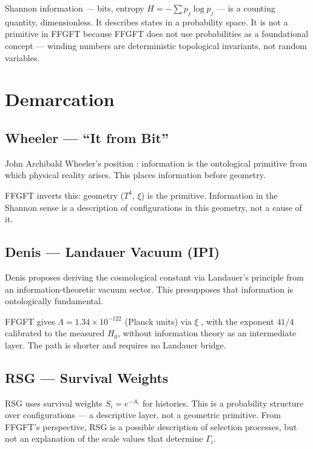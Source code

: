 Shannon information \cite{Shannon1948} — bits, entropy
$H = -\sum p_j \log p_j$ — is a counting quantity, dimensionless. It
describes states in a probability space. It is not a primitive in FFGFT
because FFGFT does not use probabilities as a foundational concept —
winding numbers are deterministic topological invariants, not random
variables.

\section{Demarcation}

\subsection{Wheeler — ``It from Bit''}

John Archibald Wheeler's position \cite{Wheeler1990}: information is
the ontological primitive from which physical reality arises. This places
information before geometry.

FFGFT inverts this: geometry ($T^4$, $\xi$) is the primitive. Information
in the Shannon sense is a description of configurations in this geometry,
not a cause of it.

\subsection{Denis — Landauer Vacuum (IPI)}

Denis \cite{Denis2023} proposes deriving the cosmological constant via
Landauer's principle from an information-theoretic vacuum sector. This
presupposes that information is ontologically fundamental.

FFGFT gives $\Lambda = 1.34 \times 10^{-122}$ (Planck units) via $\xi$
\cite{Pascher_182}, with the exponent $41/4$ calibrated to the measured
$H_0$, without information theory as an intermediate layer. The path is shorter and requires no Landauer bridge.

\subsection{RSG — Survival Weights}

RSG \cite{Austin2026} uses survival weights $S_i = e^{-A_i}$ for
histories. This is a probability structure over configurations — a
descriptive layer, not a geometric primitive. From FFGFT's perspective,
RSG is a possible description of selection processes, but not an
explanation of the scale values that determine $\Gamma_i$.

